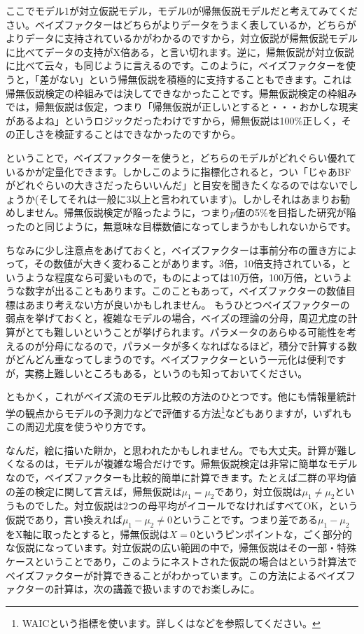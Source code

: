 \documentclass{ltjbook}
\begin{document}
ここでモデル1が対立仮説モデル，モデル0が帰無仮説モデルだと考えてみてください。ベイズファクターはどちらがよりデータをうまく表しているか，どちらがよりデータに支持されているかがわかるのですから，対立仮説が帰無仮説モデルに比べてデータの支持がX倍ある，と言い切れます。逆に，帰無仮説が対立仮説に比べて云々，も同じように言えるのです。このように，ベイズファクターを使うと，「差がない」という帰無仮説を積極的に支持することもできます。これは帰無仮説検定の枠組みでは決してできなかったことです。帰無仮説検定の枠組みでは，帰無仮説は仮定，つまり「帰無仮説が正しいとすると・・・おかしな現実があるよね」というロジックだったわけですから，帰無仮説は100\%正しく，その正しさを検証することはできなかったのですから。

ということで，ベイズファクターを使うと，どちらのモデルがどれぐらい優れているかが定量化できます。しかしこのように指標化されると，つい「じゃあBFがどれぐらいの大きさだったらいいんだ」と目安を聞きたくなるのではないでしょうか(そしてそれは一般に3以上と言われています)。しかしそれはあまりお勧めしません。帰無仮説検定が陥ったように，つまり$p$値の5\%を目指した研究が陥ったのと同じように，無意味な目標数値になってしまうかもしれないからです。

ちなみに少し注意点をあげておくと，ベイズファクターは事前分布の置き方によって，その数値が大きく変わることがあります。3倍，10倍支持されている，というような程度なら可愛いもので，ものによっては10万倍，100万倍，というような数字が出ることもあります。このこともあって，ベイズファクターの数値目標はあまり考えない方が良いかもしれません。
もうひとつベイズファクターの弱点を挙げておくと，複雑なモデルの場合，ベイズの理論の分母，周辺尤度の計算がとても難しいということが挙げられます。パラメータのあらゆる可能性を考えるのが分母になるので，パラメータが多くなればなるほど，積分で計算する数がどんどん重なってしまうのです。ベイズファクターという一元化は便利ですが，実務上難しいところもある，というのも知っておいてください。

ともかく，これがベイズ流のモデル比較の方法のひとつです。他にも情報量統計学の観点からモデルの予測力などで評価する方法\footnote{WAICという指標を使います。詳しくは\textcite{Hamada201912}などを参照してください。}などもありますが，いずれもこの周辺尤度を使うやり方です。

なんだ，絵に描いた餅か，と思われたかもしれません。でも大丈夫。計算が難しくなるのは，モデルが複雑な場合だけです。帰無仮説検定は非常に簡単なモデルなので，ベイズファクターも比較的簡単に計算できます。たとえば二群の平均値の差の検定に関して言えば，帰無仮説は$\mu_1=\mu_2$であり，対立仮説は$\mu_1 \neq \mu_2$というものでした。対立仮説は2つの母平均がイコールでなければすべてOK，という仮説であり，言い換えれば$\mu_1-\mu_2\neq 0$ということです。つまり差である$\mu_1-\mu_2$をX軸に取ったとすると，帰無仮説は$X=0$というピンポイントな，ごく部分的な仮説になっています。対立仮説の広い範囲の中で，帰無仮説はその一部・特殊ケースということであり，このようにネストされた仮説の場合は\parencite{Lee201709}という計算法でベイズファクターが計算できることがわかっています。この方法によるベイズファクターの計算は，次の講義で扱いますのでお楽しみに。
\end{document}
